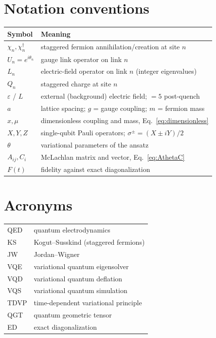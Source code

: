 \documentclass[11pt,a4paper]{article}
\begin{document}
\section{Notation conventions}
\begin{center}
\renewcommand{\arraystretch}{1.3}
\begin{tabular}{ll}
\toprule
\textbf{Symbol} & \textbf{Meaning} \\
\midrule
$\chi_n,\chi^\dagger_n$ & staggered fermion annihilation/creation at site $n$ \\
$U_n=e^{i\theta_n}$ & gauge link operator on link $n$ \\
$L_n$ & electric-field operator on link $n$ (integer eigenvalues) \\
$Q_n$ & staggered charge at site $n$ \\
$\varepsilon$ / $L$ & external (background) electric field; $=5$ post-quench \\
$a$ & lattice spacing; $g$ = gauge coupling; $m$ = fermion mass \\
$x,\mu$ & dimensionless coupling and mass, Eq.~\eqref{eq:dimensionless} \\
$X,Y,Z$ & single-qubit Pauli operators; $\sigma^\pm=(X\pm iY)/2$ \\
$\theta$ & variational parameters of the ansatz \\
$A_{ij},C_i$ & McLachlan matrix and vector, Eq.~\eqref{eq:AthetaC} \\
$F(t)$ & fidelity against exact diagonalization \\
\bottomrule
\end{tabular}
\end{center}

\section{Acronyms}
\begin{center}
\renewcommand{\arraystretch}{1.25}
\begin{tabular}{ll}
\toprule
QED & quantum electrodynamics \\
KS & Kogut--Susskind (staggered fermions) \\
JW & Jordan--Wigner \\
VQE & variational quantum eigensolver \\
VQD & variational quantum deflation \\
VQS & variational quantum simulation \\
TDVP & time-dependent variational principle \\
QGT & quantum geometric tensor \\
ED & exact diagonalization \\
\bottomrule
\end{tabular}
\end{center}
\end{document}
